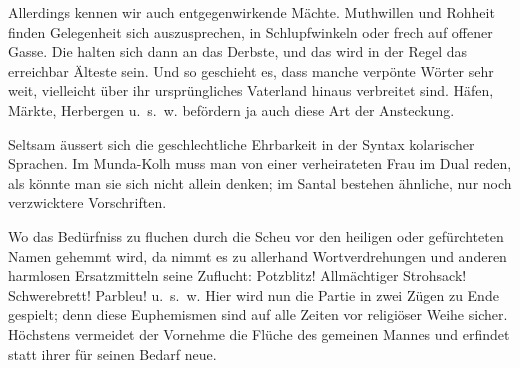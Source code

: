 {Allerdings kennen wir auch entgegenwirkende Mächte. Muthwillen und Rohheit finden Gelegenheit sich auszusprechen, in Schlupfwinkeln \label{fp.246} oder frech auf offener Gasse. Die halten sich dann an das Derbste, und das wird in der Regel das erreichbar Älteste sein. Und so geschieht es, dass manche verpönte Wörter sehr weit, vielleicht über ihr ursprüngliches Vaterland hinaus verbreitet sind. Häfen, Märkte, Herbergen u.~s.~w. befördern ja auch diese Art der Ansteckung.

Seltsam äussert sich die geschlechtliche Ehrbarkeit in der Syntax kolarischer Sprachen. Im Munda-Kolh muss man von einer verheirateten Frau im Dual reden, als könnte man sie sich nicht allein denken; im Santal bestehen ähnliche, nur noch verzwicktere Vorschriften.

Wo das Bedürfniss zu fluchen durch die Scheu vor den heiligen oder gefürchteten Namen gehemmt wird, da nimmt es zu allerhand Wortverdrehungen und anderen harmlosen Ersatzmitteln seine Zuflucht: Potzblitz! Allmächtiger Strohsack! Schwerebrett! Parbleu! u.~s.~w. Hier wird nun die Partie in zwei Zügen zu Ende gespielt; denn diese Euphemismen sind auf alle Zeiten vor religiöser Weihe sicher. Höchstens vermeidet der Vornehme die Flüche des gemeinen Mannes und erfindet statt ihrer für seinen Bedarf neue.

}
